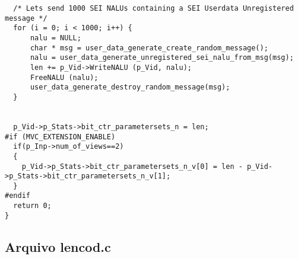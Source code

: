 \begin{lstlisting}
  /* Lets send 1000 SEI NALUs containing a SEI Userdata Unregistered message */
  for (i = 0; i < 1000; i++) {
      nalu = NULL;
      char * msg = user_data_generate_create_random_message();
      nalu = user_data_generate_unregistered_sei_nalu_from_msg(msg);
      len += p_Vid->WriteNALU (p_Vid, nalu);
      FreeNALU (nalu);
      user_data_generate_destroy_random_message(msg);
  }


  p_Vid->p_Stats->bit_ctr_parametersets_n = len;
#if (MVC_EXTENSION_ENABLE)
  if(p_Inp->num_of_views==2)
  {
    p_Vid->p_Stats->bit_ctr_parametersets_n_v[0] = len - p_Vid->p_Stats->bit_ctr_parametersets_n_v[1];
  }
#endif
  return 0;
}
\end{lstlisting}

\subsection{Arquivo lencod.c}
